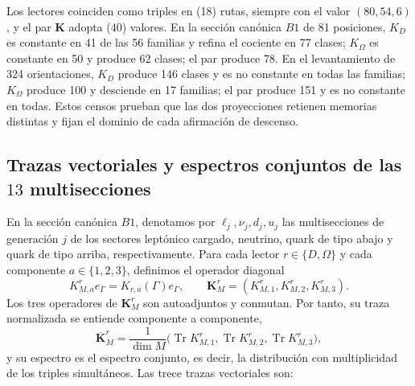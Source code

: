 Los lectores coinciden como triples en (18) rutas, siempre con el valor
\((80,54,6)\), y el par \(\mathbf K\) adopta (40) valores. En la sección
canónica \(B1\) de 81 posiciones, \(K_D\) es constante en 41 de las 56
familias y refina el cociente en 77 clases; \(K_\Omega\) es constante en 50
y produce 62 clases; el par produce 78. En el levantamiento de 324
orientaciones, \(K_D\) produce 146 clases y es no constante en todas las
familias; \(K_\Omega\) produce 100 y desciende en 17 familias; el par produce
151 y es no constante en todas. Estos censos prueban que las dos
proyecciones retienen memorias distintas y fijan el dominio de cada
afirmación de descenso.

\subsection{Trazas vectoriales y espectros conjuntos de las \(13\) multisecciones}

En la sección canónica \(B1\), denotamos por
\(\ell_j,\nu_j,d_j,u_j\) las multisecciones de generación \(j\) de los
sectores leptónico cargado, neutrino, quark de tipo abajo y quark de tipo
arriba, respectivamente. Para cada lector
\(r\in\{D,\Omega\}\) y cada componente \(a\in\{1,2,3\}\), definimos el
operador diagonal
\[
 K_{M,a}^r e_\Gamma=K_{r,a}(\Gamma)e_\Gamma,
 \qquad
 \mathbf K_M^r=(K_{M,1}^r,K_{M,2}^r,K_{M,3}^r).
\]
Los tres operadores de \(\mathbf K_M^r\) son autoadjuntos y conmutan. Por
tanto, su traza normalizada se entiende componente a componente,
\[
 \overline{\mathbf K}_M^r
 =\frac{1}{\dim M}
 \bigl(\operatorname{Tr}K_{M,1}^r,
       \operatorname{Tr}K_{M,2}^r,
       \operatorname{Tr}K_{M,3}^r\bigr),
\]
y su espectro es el espectro conjunto, es decir, la distribución con
multiplicidad de los triples simultáneos. Las trece trazas vectoriales son:

